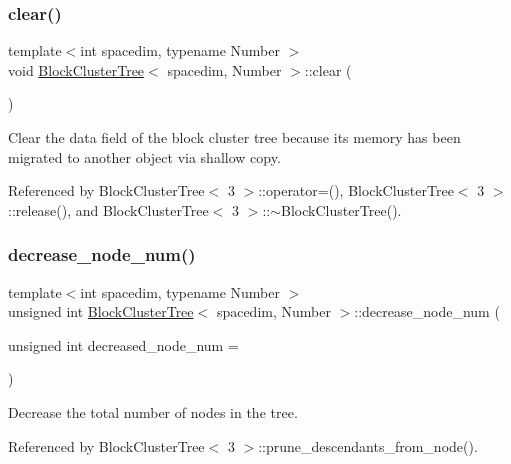 \mbox{\label{classBlockClusterTree_ab4227d666cd2872fbbfb4eec69e66313}} 
\subsubsection{\texorpdfstring{clear()}{clear()}}
{\footnotesize\ttfamily template$<$int spacedim, typename Number $>$ \\
void \hyperlink{classBlockClusterTree}{Block\+Cluster\+Tree}$<$ spacedim, Number $>$\+::clear (\begin{DoxyParamCaption}{ }\end{DoxyParamCaption})}

Clear the data field of the block cluster tree because its memory has been migrated to another object via shallow copy. 

Referenced by Block\+Cluster\+Tree$<$ 3 $>$\+::operator=(), Block\+Cluster\+Tree$<$ 3 $>$\+::release(), and Block\+Cluster\+Tree$<$ 3 $>$\+::$\sim$\+Block\+Cluster\+Tree().

\mbox{\label{classBlockClusterTree_ae0e55e3ac56bffa31f251d4f07ae7e51}} 
\subsubsection{\texorpdfstring{decrease\+\_\+node\+\_\+num()}{decrease\_node\_num()}}
{\footnotesize\ttfamily template$<$int spacedim, typename Number $>$ \\
unsigned int \hyperlink{classBlockClusterTree}{Block\+Cluster\+Tree}$<$ spacedim, Number $>$\+::decrease\+\_\+node\+\_\+num (\begin{DoxyParamCaption}\item[{unsigned int}]{decreased\+\_\+node\+\_\+num = {} }\end{DoxyParamCaption})}

Decrease the total number of nodes in the tree. 

Referenced by Block\+Cluster\+Tree$<$ 3 $>$\+::prune\+\_\+descendants\+\_\+from\+\_\+node().

\mbox{\label{classBlockClusterTree_a3c4a4da89b964559cc02ecbf13ad4a4b}} 
